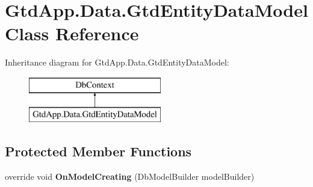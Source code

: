\hypertarget{class_gtd_app_1_1_data_1_1_gtd_entity_data_model}{}\section{Gtd\+App.\+Data.\+Gtd\+Entity\+Data\+Model Class Reference}
\label{class_gtd_app_1_1_data_1_1_gtd_entity_data_model}
Inheritance diagram for Gtd\+App.\+Data.\+Gtd\+Entity\+Data\+Model\+:\begin{figure}[H]
\begin{center}
\leavevmode
\includegraphics[height=2.000000cm]{class_gtd_app_1_1_data_1_1_gtd_entity_data_model}
\end{center}
\end{figure}
\subsection*{Protected Member Functions}
\begin{DoxyCompactItemize}
\item 
\mbox{\label{class_gtd_app_1_1_data_1_1_gtd_entity_data_model_a3ce1991202dd560d6e677d632ed3f411}} 
override void {\bfseries On\+Model\+Creating} (Db\+Model\+Builder model\+Builder)
\end{DoxyCompactItemize}
